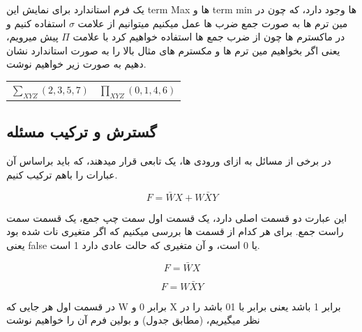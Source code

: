 \documentclass[20pt, a4paper]{article}
\begin{document}
\newpage

یک فرم استاندارد برای نمایش این term Max ها و term min ها وجود دارد، که چون در مین ترم ها به صورت جمع ضرب ها عمل میکنیم میتوانیم از علامت
$\sigma$
استفاده کنیم و در ماکسترم ها چون از ضرب جمع ها استفاده خواهیم کرد با علامت
$\Pi$
پیش میرویم، یعنی اگر بخواهیم مین ترم ها و مکسترم های مثال بالا را به صورت استاندارد نشان دهیم به صورت زیر خواهیم نوشت.

\begin{LTR}
	\begin{tabular}{c | c}
		$\sum_{XYZ} (2, 3, 5, 7)$ & $\prod_{XYZ} (0,1,4,6)$
	\end{tabular}
\end{LTR}

\subsection{گسترش و ترکیب مسئله}
در برخی از مسائل
به ازای ورودی ها، یک تابعی قرار میدهند، که باید براساس
آن عبارات را باهم ترکیب کنیم.

\begin{LTR}
	\begin{equation}
		F = \bar{W}X + W\bar{X}Y
	\end{equation}
\end{LTR}
این عبارت دو قسمت اصلی دارد، یک قسمت اول سمت چپ جمع،
یک قسمت سمت راست جمع.
برای هر کدام از قسمت ها بررسی میکنیم که اگر متغیری نات شده بود
یعنی false
یا 0 است، و آن متغیری که حالت عادی دارد 1 است.

\begin{LTR}
	\begin{equation}
		F = \bar{W}X  
	\end{equation}
	
	\begin{equation}
		F = W\bar{X}Y 
	\end{equation}
\end{LTR}

در قسمت اول هر جایی که
W
برابر 0 و
X
برابر 1 باشد یعنی
برابر با 01 باشد را در نظر میگیریم، 
(مطابق جدول)
و بولین فرم آن را خواهیم نوشت
\end{document}
